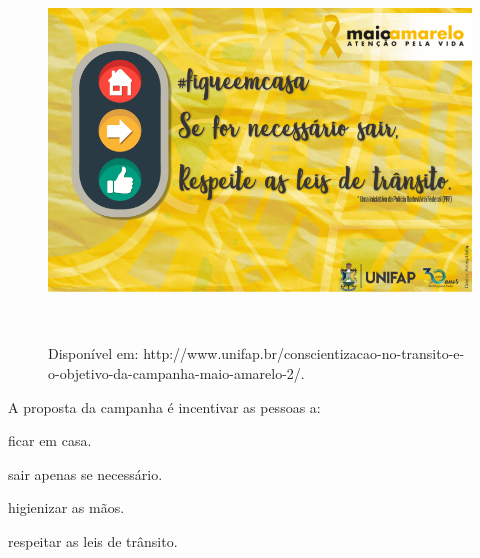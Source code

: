 \begin{figure}[H]
\centering\includegraphics[width=5.90556in,height=3.95694in]{./imgSAEB_6_POR/media/image38.png}
\caption{Disponível em: http://www.unifap.br/conscientizacao-no-transito-e-o-objetivo-da-campanha-maio-amarelo-2/.}
\end{figure}

\noindent A proposta da campanha é incentivar as pessoas a:

\begin{escolha}
\item ficar em casa.
\item sair apenas se necessário.
\item higienizar as mãos.
\item respeitar as leis de trânsito.
\end{escolha}



